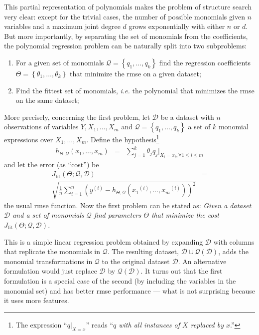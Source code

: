 \documentclass[times,review,preprint]{elsarticle}
\newcommand{\sample}[1]{\ensuremath{^{\left(#1\right)}}}
\begin{document}
This partial representation of polynomials makes the problem of structure search very clear: except for the trivial cases, the number of possible monomials given $n$ variables and a maximum joint degree $d$ grows exponentially with either $n$ or $d$. But more importantly, by separating the set of monomials from the coefficients, the polynomial regression problem can be naturally split into two subproblems:
%
\begin{enumerate}
\item For a given set of monomials $\mathcal{Q} = \left\lbrace q_1, \ldots, q_k\right\rbrace$ find the regression coefficients $\Theta = \left\lbrace \theta_1,\ldots,\theta_k \right\rbrace$ that minimize the \ac{rmse} on a given dataset;

\item Find the fittest set of monomials, \emph{i.e.} the polynomial that minimizes the \ac{rmse} on the same dataset;
\end{enumerate}
%
More precisely, concerning the first problem, let $\mathcal{D}$ be a dataset with $n$ observations of variables $Y, X_1,\ldots,X_m$ and $\mathcal{Q} = \left\lbrace q_1,\ldots, q_k\right\rbrace$ a set of $k$ monomial expressions over $X_1,\ldots,X_m$. Define the hypothesis\footnote{The expression ``$q|_{X=x}$'' reads ``\emph{$q$ with all instances of $X$ replaced by $x$}.''}
%
\begin{eqnarray*}
h_{\Theta,\mathcal{Q}}\left(x_1,\ldots,x_m\right) &=& \sum_{j = 1}^k \theta_j q_j|_{X_i=x_i,\forall 1 \leq i \leq m}
\end{eqnarray*}
%
and let the error (as ``cost'') be
%
\begin{eqnarray}
J_{\textrm{fit}}\left(\Theta;\mathcal{Q},\mathcal{D}\right)  & =  \nonumber \\
\sqrt{\frac{1}{n}\sum_{i=1}^n \left( y\sample{i} - h_{\Theta,\mathcal{Q}}\left( x_1\sample{i},\ldots,x_m\sample{i} \right) \right)^2 }\label{eq:rmse}
\end{eqnarray}
%
the usual \acf{rmse} function. Now the first problem can be stated as:
%
\emph{Given a dataset $\mathcal{D}$ and a set of monomials $\mathcal{Q}$ find parameters $\Theta$ that minimize the cost $J_{\textrm{fit}}\left(\Theta;\mathcal{Q},\mathcal{D}\right)$.}

%
This is a simple linear regression problem obtained by expanding $\mathcal{D}$ with columns that replicate the monomials in $\mathcal{Q}$. The resulting dataset, $\mathcal{D} \cup \mathcal{Q}\left( \mathcal{D} \right)$, adds the monomial transformations in $\mathcal{Q}$ to the original dataset $\mathcal{D}$. An alternative formulation would just replace $\mathcal{D}$ by $\mathcal{Q}\left( \mathcal{D} \right)$. It turns out that the first formulation is a special case of the second (by including the variables in the monomial set) and has better \ac{rmse} performance --- what is not surprising because it uses more features.
\end{document}
